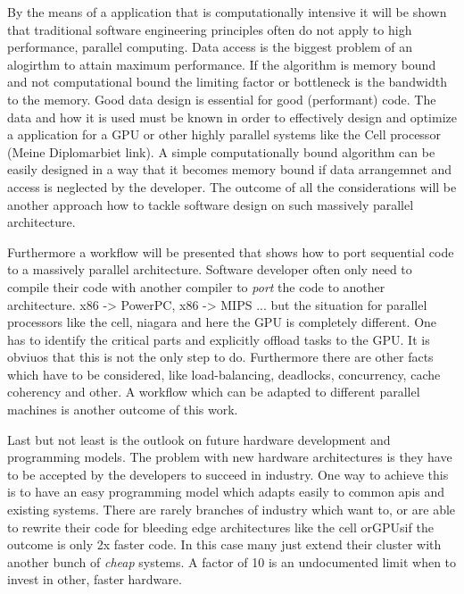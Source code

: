 By the means of a application that is computationally intensive it will be shown
that traditional software engineering principles often do not apply to high
performance, parallel computing. Data access is the biggest problem of an
alogirthm to attain maximum performance. If the algorithm is memory bound and
not computational bound the limiting factor or bottleneck is the bandwidth to
the memory. Good data design is essential for good (performant) code. The data
and how it is used must be known in order to effectively design and optimize a
application for a \gls{GPU} or other highly parallel systems like the Cell processor
(Meine Diplomarbiet link). A simple computationally bound algorithm can be
easily designed in a way that it becomes memory bound if data arrangemnet and
access is neglected by the developer. The outcome of all the considerations will
be another approach how to tackle software design on such massively parallel
architecture.

Furthermore a workflow will be presented that shows how to port sequential code
to a massively parallel architecture. Software developer often only need to
compile their code with another compiler to \emph{port} the code to another
architecture. x86 -> PowerPC, x86 -> MIPS ... but the situation for parallel
processors like the cell, niagara and here the \gls{GPU} is completely different. One
has to identify the critical parts and explicitly offload tasks to the GPU. It
is obviuos that this is not the only step to do. Furthermore there are other
facts which have to be considered, like load-balancing, deadlocks, concurrency,
cache coherency and other. A workflow which can be adapted to different parallel
machines is another outcome of this work.

Last but not least is the outlook on future hardware development and programming
models. The problem with new hardware architectures is they have to be accepted
by the developers to succeed in industry. One way to achieve this is to have an
easy programming model which adapts easily to common apis and existing systems.
There are rarely branches of industry which want to, or are able to rewrite
their code for bleeding edge architectures like the cell or\glspl{GPU}if the outcome
is only 2x faster code. In this case many just extend their cluster with another
bunch of \emph{cheap} systems. A factor of 10 is an undocumented limit when to
invest in other, faster hardware.

